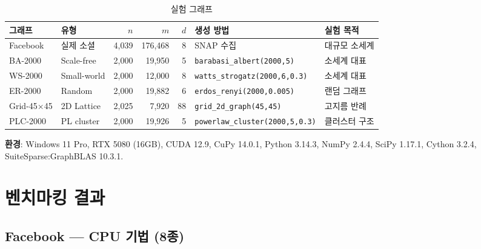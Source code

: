 \documentclass[11pt,a4paper]{article}
\begin{document}
\begin{table}[H]\centering
\caption{실험 그래프}
\label{tab:datasets}
\small
\begin{tabular}{@{}llrrrll@{}}
\toprule
\textbf{그래프} & \textbf{유형} & $n$ & $m$ & $d$ & \textbf{생성 방법} & \textbf{실험 목적} \\
\midrule
Facebook & 실제 소셜 & 4,039 & 176,468 & 8 & SNAP 수집 & 대규모 소세계 \\
BA-2000 & Scale-free & 2,000 & 19,950 & 5 & \texttt{barabasi\_albert(2000,5)} & 소세계 대표 \\
WS-2000 & Small-world & 2,000 & 12,000 & 8 & \texttt{watts\_strogatz(2000,6,0.3)} & 소세계 대표 \\
ER-2000 & Random & 2,000 & 19,882 & 6 & \texttt{erdos\_renyi(2000,0.005)} & 랜덤 그래프 \\
Grid-45$\times$45 & 2D Lattice & 2,025 & 7,920 & 88 & \texttt{grid\_2d\_graph(45,45)} & 고지름 반례 \\
PLC-2000 & PL cluster & 2,000 & 19,926 & 5 & \texttt{powerlaw\_cluster(2000,5,0.3)} & 클러스터 구조 \\
\bottomrule
\end{tabular}
\end{table}

\noindent\textbf{환경}: Windows 11 Pro, RTX 5080 (16GB), CUDA 12.9, CuPy 14.0.1, Python 3.14.3, NumPy 2.4.4, SciPy 1.17.1, Cython 3.2.4, SuiteSparse:GraphBLAS 10.3.1.

\section{벤치마킹 결과}

\subsection{Facebook --- CPU 기법 (8종)}
\end{document}
